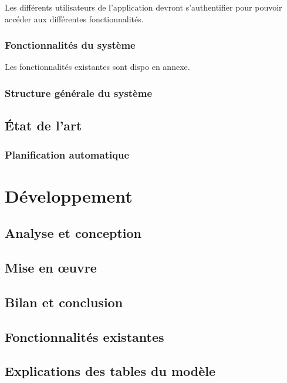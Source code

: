 \documentclass{polytech/polytech}
\begin{document}
Les différents utilisateurs de l'application devront s'authentifier pour pouvoir accéder aux
différentes fonctionnalités.


\section{Fonctionnalités du système}


Les fonctionnalités existantes sont dispo en annexe.



\section{Structure générale du système}


\chapter{État de l'art}


\section{Planification automatique}


\part{Développement}


\chapter{Analyse et conception}


\chapter{Mise en œuvre}


\chapter{Bilan et conclusion}


\appendix

\chapter{Fonctionnalités existantes}



\chapter{Explications des tables du modèle}
\end{document}
